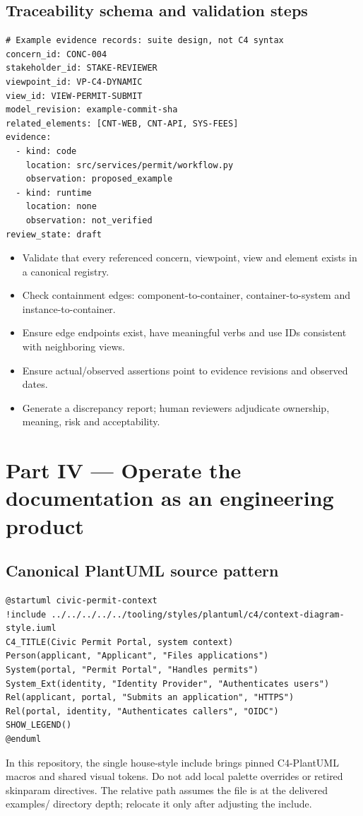 \documentclass[10pt,letterpaper]{article}
\begin{document}
\subsection{Traceability schema and validation steps}
\begin{lstlisting}
# Example evidence records: suite design, not C4 syntax
concern_id: CONC-004
stakeholder_id: STAKE-REVIEWER
viewpoint_id: VP-C4-DYNAMIC
view_id: VIEW-PERMIT-SUBMIT
model_revision: example-commit-sha
related_elements: [CNT-WEB, CNT-API, SYS-FEES]
evidence:
  - kind: code
    location: src/services/permit/workflow.py
    observation: proposed_example
  - kind: runtime
    location: none
    observation: not_verified
review_state: draft
\end{lstlisting}
\begin{itemize}
\item Validate that every referenced concern, viewpoint, view and element exists in a canonical registry.
\item Check containment edges: component-to-container, container-to-system and instance-to-container.
\item Ensure edge endpoints exist, have meaningful verbs and use IDs consistent with neighboring views.
\item Ensure actual/observed assertions point to evidence revisions and observed dates.
\item Generate a discrepancy report; human reviewers adjudicate ownership, meaning, risk and acceptability.
\end{itemize}
\section{Part IV — Operate the documentation as an engineering product}
\subsection{Canonical PlantUML source pattern}
\begin{lstlisting}
@startuml civic-permit-context
!include ../../../../../tooling/styles/plantuml/c4/context-diagram-style.iuml
C4_TITLE(Civic Permit Portal, system context)
Person(applicant, "Applicant", "Files applications")
System(portal, "Permit Portal", "Handles permits")
System_Ext(identity, "Identity Provider", "Authenticates users")
Rel(applicant, portal, "Submits an application", "HTTPS")
Rel(portal, identity, "Authenticates callers", "OIDC")
SHOW_LEGEND()
@enduml
\end{lstlisting}
In this repository, the single house-style include brings pinned C4-PlantUML macros and shared visual tokens. Do not add local palette overrides or retired skinparam directives. The relative path assumes the file is at the delivered examples/ directory depth; relocate it only after adjusting the include.
\end{document}
